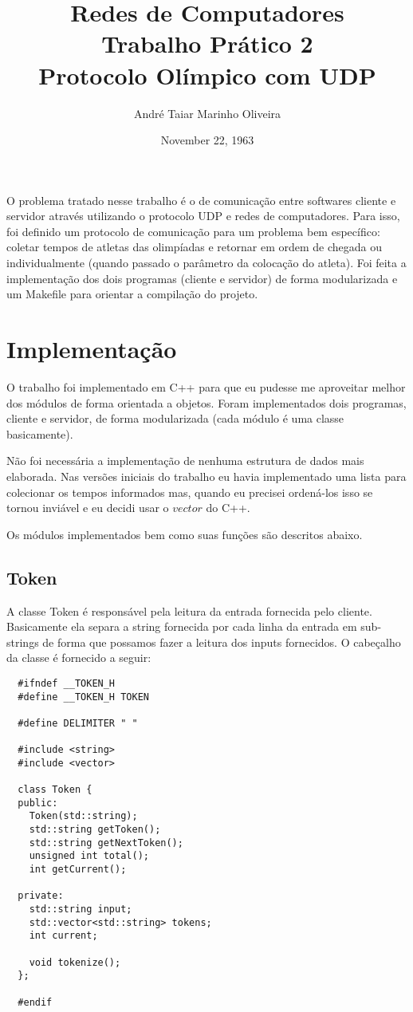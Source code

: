 \documentclass[12pt]{article}
\title{Redes de Computadores \\ Trabalho Prático 2 \\
\huge{Protocolo Olímpico com UDP}}
\date{November 22, 1963}
\author{André Taiar Marinho Oliveira}
\begin{document}
\maketitle

\begin{resumo}
O problema tratado nesse trabalho é o de comunicação entre softwares cliente e
servidor através utilizando o protocolo UDP e redes de computadores.
Para isso, foi definido um protocolo de comunicação para um problema bem
específico: coletar tempos de atletas das olimpíadas e retornar em ordem de
chegada ou individualmente (quando passado o parâmetro da colocação do atleta).
Foi feita a implementação dos dois programas (cliente e servidor) de forma
modularizada e um Makefile para orientar a compilação do projeto.
\end{resumo}

\section{Implementação}

O trabalho foi implementado em C++ para que eu pudesse me aproveitar melhor dos
módulos de forma orientada a objetos. Foram implementados dois programas,
cliente e servidor, de forma modularizada (cada módulo é uma classe
basicamente).

Não foi necessária a implementação de nenhuma estrutura de dados mais elaborada.
Nas versões iniciais do trabalho eu havia implementado uma lista para colecionar
os tempos informados mas, quando eu precisei ordená-los isso se tornou inviável
e eu decidi usar o $vector$ do C++.

Os módulos implementados bem como suas funções são descritos abaixo.

\subsection{Token}

A classe Token é responsável pela leitura da entrada fornecida pelo cliente.
Basicamente ela separa a string fornecida por cada linha da entrada em
sub-strings de forma que possamos fazer a leitura dos inputs fornecidos. O
cabeçalho da classe é fornecido a seguir:

\begin{verbatim}
  #ifndef __TOKEN_H
  #define __TOKEN_H TOKEN

  #define DELIMITER " "

  #include <string>
  #include <vector>

  class Token {
  public:
    Token(std::string);
    std::string getToken();
    std::string getNextToken();
    unsigned int total();
    int getCurrent();

  private:
    std::string input;
    std::vector<std::string> tokens;
    int current;

    void tokenize();
  };

  #endif
\end{verbatim}
\end{document}
